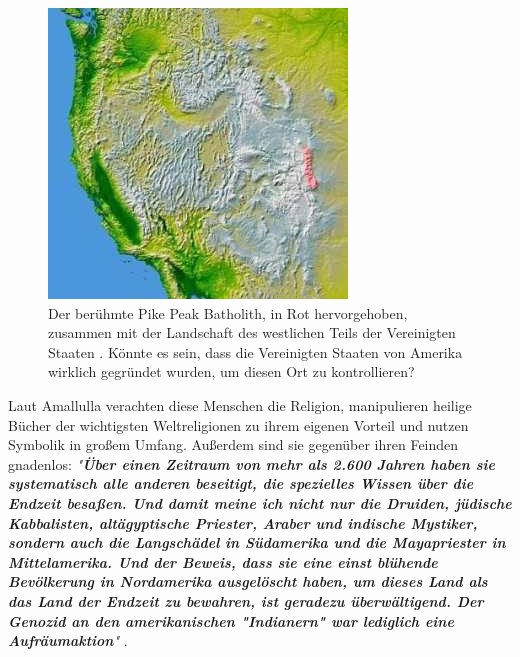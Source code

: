 \documentclass[10pt,twocolumn,letterpaper]{article}
\begin{document}
\begin{figure}[t]

\begin{center}
   \includegraphics[width=1\linewidth]{pike.jpg}
\end{center}
   \caption{Der berühmte Pike Peak Batholith, in Rot hervorgehoben, zusammen mit der Landschaft des westlichen Teils der Vereinigten Staaten \cite{36}. Könnte es sein, dass die Vereinigten Staaten von Amerika wirklich gegründet wurden, um diesen Ort zu kontrollieren?}
\label{fig:11}
\label{fig:onecol}
\end{figure}

Laut Amallulla verachten diese Menschen die Religion, manipulieren heilige Bücher der wichtigsten Weltreligionen zu ihrem eigenen Vorteil und nutzen Symbolik in großem Umfang. Außerdem sind sie gegenüber ihren Feinden gnadenlos: \textit{"\textbf{Über einen Zeitraum von mehr als 2.600 Jahren haben sie systematisch alle anderen beseitigt, die spezielles Wissen über die Endzeit besaßen. Und damit meine ich nicht nur die Druiden, jüdische Kabbalisten, altägyptische Priester, Araber und indische Mystiker, sondern auch die Langschädel in Südamerika und die Mayapriester in Mittelamerika. Und der Beweis, dass sie eine einst blühende Bevölkerung in Nordamerika ausgelöscht haben, um dieses Land als das Land der Endzeit zu bewahren, ist geradezu überwältigend. Der Genozid an den amerikanischen "Indianern" war lediglich eine Aufräumaktion}"} \cite{33,34}.
\end{document}
